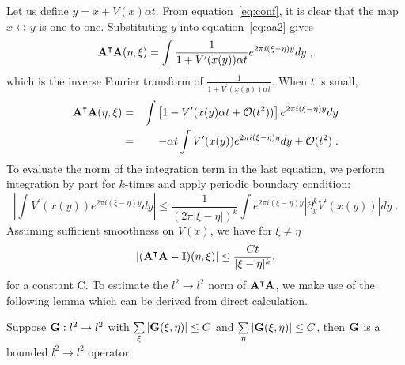 Let us define $y=x+V(x)\alpha t$. From equation~\ref{eq:conf}, it is
clear that the map $x \leftrightarrow y$ is one to one. Substituting
$y$ into equation~\ref{eq:aa2} gives
\begin{equation}
\label{eq:aa3}
\mathbf{A}^{\intercal}\mathbf{A}(\eta,\xi) = \int \frac{1}{1+V^{\prime}(x(y))\alpha t} e^{2\pi i(\xi-\eta)y} dy \; ,
\end{equation}
which is the inverse Fourier transform of
$\frac{1}{1+V^{\prime}(x(y))\alpha t}$.  When $t$ is small,
\begin{eqnarray}
\label{eq:aa4}
\mathbf{A}^{\intercal}\mathbf{A}(\eta,\xi) &=& \int \left[ 1-V^{\prime}(x(y)\alpha t+\mathcal{O}(t^2)) \right]e^{2\pi i(\xi-\eta)y} dy \\
&=& -\alpha t \int V^{\prime}(x(y)) e^{2\pi i(\xi-\eta)y} dy + \mathcal{O}(t^2) \; . \nonumber
\end{eqnarray}
To evaluate the norm of the integration term in the last equation, we
perform integration by part for $k$-times and apply periodic boundary
condition:
\begin{equation}
\left| \int V^{\prime}(x(y)) e^{2\pi i(\xi-\eta)y} dy \right| \leq \frac{1}{(2\pi |\xi-\eta|)^k} \int e^{2\pi i(\xi-\eta)y} \left | \partial_y^k V^{\prime}(x(y)) \right| dy \; .
\end{equation}
Assuming sufficient smoothness on $V(x)$, we have for $\xi \neq \eta$
\begin{equation}
|(\mathbf{A}^{\intercal}\mathbf{A}-\mathbf{I})(\eta,\xi)| \leq \frac{Ct}{|\xi-\eta|^k},
\end{equation}
for a constant C. To estimate the $l^2\to l^2$ norm of
$\mathbf{A}^{\intercal}\mathbf{A}$, we make use of the following lemma which can be
derived from direct calculation.
\begin{lemma}
  Suppose $\mathbf{G}: l^2\to l^2$ with $\sum\limits_\xi|\mathbf{G}(\xi,\eta)|\leq C$
  and $\sum\limits_\eta|\mathbf{G}(\xi,\eta)|\leq C$, then $\mathbf{G}$ is a bounded
  $l^2\to l^2$ operator.
\end{lemma}


